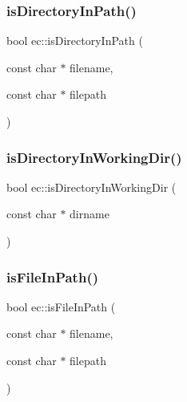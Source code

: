 \mbox{\label{namespaceec_a1ccd5223ec4ce469d1f79fbc29732d1a}} 
\subsubsection{\texorpdfstring{is\+Directory\+In\+Path()}{isDirectoryInPath()}}
{\footnotesize\ttfamily bool ec\+::is\+Directory\+In\+Path (\begin{DoxyParamCaption}\item[{const char $\ast$}]{filename,  }\item[{const char $\ast$}]{filepath }\end{DoxyParamCaption})}

\mbox{\label{namespaceec_a36d215dba638ca4f51f94404161d5367}} 
\subsubsection{\texorpdfstring{is\+Directory\+In\+Working\+Dir()}{isDirectoryInWorkingDir()}}
{\footnotesize\ttfamily bool ec\+::is\+Directory\+In\+Working\+Dir (\begin{DoxyParamCaption}\item[{const char $\ast$}]{dirname }\end{DoxyParamCaption})}

\mbox{\label{namespaceec_a2f3219c94de0f769108330a534dbbdc0}} 
\subsubsection{\texorpdfstring{is\+File\+In\+Path()}{isFileInPath()}}
{\footnotesize\ttfamily bool ec\+::is\+File\+In\+Path (\begin{DoxyParamCaption}\item[{const char $\ast$}]{filename,  }\item[{const char $\ast$}]{filepath }\end{DoxyParamCaption})}

\mbox{\label{namespaceec_a94eb2397937cb10b42f1f50cbba648d9}} 
